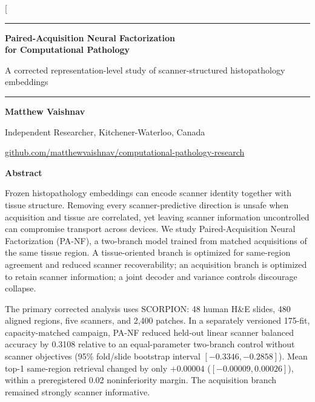 \documentclass[10pt]{article}
\newcommand{\panf}{Paired-Acquisition Neural Factorization}
\begin{document}
\raggedright
\twocolumn[{
\begin{center}
\rule{\textwidth}{1.35pt}
\vspace{0.10in}

{\LARGE\bfseries Paired-Acquisition Neural Factorization\\
for Computational Pathology\par}

\vspace{0.08in}
{\large A corrected representation-level study of scanner-structured histopathology embeddings\par}
\vspace{0.10in}
\rule{\textwidth}{0.50pt}
\vspace{0.12in}

{\bfseries Matthew Vaishnav}\par
Independent Researcher, Kitchener-Waterloo, Canada\par
\href{https://github.com/matthewvaishnav/computational-pathology-research}{github.com/matthewvaishnav/computational-pathology-research}
\end{center}

\vspace{0.04in}
\begin{center}
\begin{minipage}{0.92\textwidth}
\begin{center}\bfseries Abstract\end{center}
\small
Frozen histopathology embeddings can encode scanner identity together with tissue structure. Removing every scanner-predictive direction is unsafe when acquisition and tissue are correlated, yet leaving scanner information uncontrolled can compromise transport across devices. We study \panf{} (PA-NF), a two-branch model trained from matched acquisitions of the same tissue region. A tissue-oriented branch is optimized for same-region agreement and reduced scanner recoverability; an acquisition branch is optimized to retain scanner information; a joint decoder and variance controls discourage collapse.

The primary corrected analysis uses SCORPION: 48 human H\&E slides, 480 aligned regions, five scanners, and 2,400 patches. In a separately versioned 175-fit, capacity-matched campaign, PA-NF reduced held-out linear scanner balanced accuracy by 0.3108 relative to an equal-parameter two-branch control without scanner objectives (95\% fold/slide bootstrap interval $[-0.3346,-0.2858]$). Mean top-1 same-region retrieval changed by only $+0.00004$ ($[-0.00009,0.00026]$), within a preregistered 0.02 noninferiority margin. The acquisition branch remained strongly scanner informative.


\end{minipage}
\end{center}}
\end{document}
